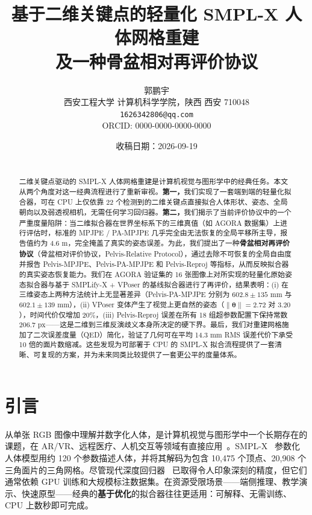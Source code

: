 \documentclass[a4paper,11pt]{article}
\title{基于二维关键点的轻量化 SMPL-X 人体网格重建 \\ 及一种骨盆相对再评价协议}
\author{
  郭鹏宇 \\
  \small 西安工程大学 计算机科学学院，陕西 西安 710048 \\
  \small \texttt{1626342806@qq.com} \\
  \small ORCID: 0000-0000-0000-0000
}
\date{收稿日期：2026-09-19}
\newcommand{\prp}{骨盆相对评价协议}
\begin{document}
\maketitle

\begin{abstract}
~\\
二维关键点驱动的 SMPL-X 人体网格重建是计算机视觉与图形学中的经典任务。本文从两个角度对这一经典流程进行了重新审视。\textbf{第一，}我们实现了一套端到端的轻量化拟合器，可在 CPU 上仅依靠 22 个检测到的二维关键点直接拟合人体形状、姿态、全局朝向以及弱透视相机，无需任何学习回归器。\textbf{第二，}我们揭示了当前评价协议中的一个严重度量陷阱：当二维拟合器在世界坐标系下的三维真值（如 AGORA 数据集）上进行评估时，标准的 MPJPE / PA-MPJPE 几乎完全由无法恢复的全局平移所主导，报告值约为 4.6 m，完全掩盖了真实的姿态误差。为此，我们提出了一种\textbf{骨盆相对再评价协议}（\prp，Pelvis-Relative Protocol），通过去除不可恢复的全局自由度并报告 Pelvis-MPJPE、Pelvis-PA-MPJPE 和 Pelvis-Reproj 等指标，从而反映拟合器的真实姿态恢复能力。我们在 AGORA 验证集的 16 张图像上对所实现的轻量化原始姿态拟合器与基于 SMPLify-X + VPoser 的基线拟合器进行了再评价，结果表明：(i) 在三维姿态上两种方法统计上无显著差异（Pelvis-PA-MPJPE 分别为 $602.8 \pm 135$ mm 与 $602.1 \pm 139$ mm），(ii) VPoser 变体产生了视觉上更自然的姿态（$\|\boldsymbol{\theta}\|=2.72$ 对 $3.20$），时间代价仅增加 20\%，(iii) Pelvis-Reproj 误差在所有 18 组超参数配置下保持常数 $206.7$ px——这是二维到三维反演歧义本身所决定的硬下界。最后，我们对重建网格施加了二次误差度量（QED）简化，验证了几何可在平均 14.3 mm RMS 误差代价下承受 10 倍的面片数缩减。这些发现为可部署于 CPU 的 SMPL-X 拟合流程提供了一套清晰、可复现的方案，并为未来同类比较提供了一套更公平的度量体系。

\end{abstract}

\section{引言}
\label{sec:intro}

从单张 RGB 图像中理解并数字化人体，是计算机视觉与图形学中一个长期存在的课题，在 AR/VR、远程医疗、人机交互等领域有直接应用~\cite{SMPLX,SMPL_simplify,HMR}。SMPL-X~\cite{SMPLX} 参数化人体模型用约 120 个参数描述人体，并将其解码为包含 10{,}475 个顶点、20{,}908 个三角面片的三角网格。尽管现代深度回归器~\cite{HMR,SPIN,ExPose,PIXIE} 已取得令人印象深刻的精度，但它们通常依赖 GPU 训练和大规模标注数据集。在资源受限场景——端侧推理、教学演示、快速原型——经典的\textbf{基于优化}的拟合器往往更适用：可解释、无需训练、CPU 上数秒即可完成。
\end{document}
